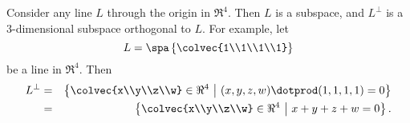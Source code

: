 
\begin{example}
Consider any line \(L\) through the origin in \(\Re^4\). Then \(L\) is a subspace, and \(L^\perp\) is a \(3\)-dimensional subspace orthogonal to \(L\). For example, let 
\[L=\spa \left\{ \colvec{1\\1\\1\\1} \right\}\] 
be a line in \(\Re^4.\) Then 
\begin{eqnarray*}
L^\perp&=&\left \{  \colvec{x\\y\\z\\w} \in \Re^4 ~\middle| ~ (x,y,z,w) \dotprod (1,1,1,1)=0 \right\} \\
&=&\left\{ \colvec{x\\y\\z\\w} \in \Re^4 ~\middle| ~ x+y+z+w=0 \right \}.
\end{eqnarray*}


\end{example}

